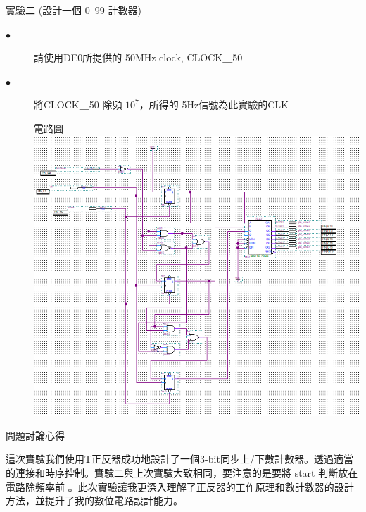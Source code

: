 \documentclass[12pt, a4paper]{article}
\begin{document}
\begin{description}
\begin{description}
          \fontsize{20pt}{22pt}\selectfont
          \item 實驗二 (設計一個 0~99 計數器)
            \fontsize{16pt}{18pt}\selectfont
              \begin{description}
                \item [$\bullet$]請使用DE0所提供的 50MHz clock, CLOCK＿50
                \item [$\bullet$] 將CLOCK＿50 除頻 $10^7$，所得的 5Hz信號為此實驗的CLK\\
                \fontsize{18pt}{20pt}
                  \item []電路圖 \\[.3cm]
                    \includegraphics[width=13cm]{./image/ex2.png}
              \end{description}
            \normalsize
        \normalsize
      \end{description}
    \item [三、]問題討論心得 \\[.6cm]
      \begin{minipage}[t]{\linewidth}
        \fontsize{16}{18}\selectfont
        這次實驗我們使用T正反器成功地設計了一個3-bit同步上/下數計數器。透過適當的連接和時序控制。實驗二與上次實驗大致相同，要注意的是要將 start 判斷放在電路除頻率前
        。此次實驗讓我更深入理解了正反器的工作原理和數計數器的設計方法，並提升了我的數位電路設計能力。
      \end{minipage}
  \normalsize
\end{description}
\end{document}
